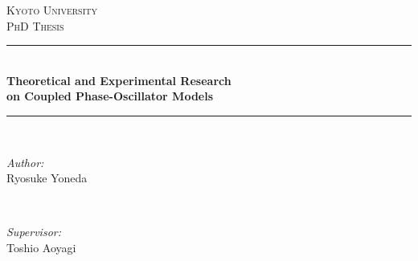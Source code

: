 \begin{titlepage}

  \newcommand{\HRule}{\rule{\linewidth}{0.5mm}} %
  
  \center %
   
  
  \textsc{\LARGE Kyoto University}\\[1.5cm] %
  \textsc{\Large PhD Thesis}\\[0.5cm] %
  
  
  \HRule \\[0.4cm]
  { \LARGE \bfseries Theoretical and Experimental Research\\ on Coupled Phase-Oscillator Models}\\[0.4cm] %
  \HRule \\[1.5cm]
   
  
  \begin{minipage}{0.4\textwidth}
  \begin{flushleft} \large
  \emph{Author:}\\
  Ryosuke Yoneda \\
  \end{flushleft}
  \end{minipage}
  ~
  \begin{minipage}{0.4\textwidth}
  \begin{flushright} \large
  \emph{Supervisor:} \\
  Toshio Aoyagi \\
  \end{flushright}
  \end{minipage}\\[2cm]
  

\end{titlepage}

